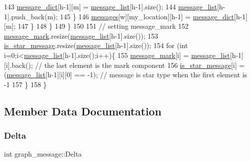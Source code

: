 \begin{DoxyCode}
143           \hyperlink{classgraph__message_ad0a6d35ac8550fb7ff03ce90fce7d5a5}{message\_dict}[h-1][m] = \hyperlink{classgraph__message_aa17fdb629b423343edfafa97252763ef}{message\_list}[h-1].size();
144           \hyperlink{classgraph__message_aa17fdb629b423343edfafa97252763ef}{message\_list}[h-1].push\_back(m);
145         \}
146         \hyperlink{classgraph__message_aac77e098f0acf9650116a8e51fe3b4b7}{messages}[w][my\_location][h-1] = \hyperlink{classgraph__message_ad0a6d35ac8550fb7ff03ce90fce7d5a5}{message\_dict}[h-1][m];
147       \}
148     \}
149   \}
150 
151   \textcolor{comment}{// setting message\_mark}
152   \hyperlink{classgraph__message_a49d9af5150daf0599c29fe18cb032fa5}{message\_mark}.resize(\hyperlink{classgraph__message_aa17fdb629b423343edfafa97252763ef}{message\_list}[h-1].size());
153   \hyperlink{classgraph__message_a55ff5531a0043106369e84a7bc45e22d}{is\_star\_message}.resize(\hyperlink{classgraph__message_aa17fdb629b423343edfafa97252763ef}{message\_list}[h-1].size());
154   \textcolor{keywordflow}{for} (\textcolor{keywordtype}{int} i=0;i<\hyperlink{classgraph__message_aa17fdb629b423343edfafa97252763ef}{message\_list}[h-1].size();i++)\{
155     \hyperlink{classgraph__message_a49d9af5150daf0599c29fe18cb032fa5}{message\_mark}[i] = \hyperlink{classgraph__message_aa17fdb629b423343edfafa97252763ef}{message\_list}[h-1][i].back(); \textcolor{comment}{// the last element is the mark
       component}
156     \hyperlink{classgraph__message_a55ff5531a0043106369e84a7bc45e22d}{is\_star\_message}[i] = (\hyperlink{classgraph__message_aa17fdb629b423343edfafa97252763ef}{message\_list}[h-1][i][0] == -1); \textcolor{comment}{// message is star
       type when the first element is -1}
157   \}
158 \}
\end{DoxyCode}


\subsection{Member Data Documentation}
\mbox{\label{classgraph__message_a45dfd061b7bc73572e5132fbf66efd55}} 
\subsubsection{\texorpdfstring{Delta}{Delta}}
{\footnotesize\ttfamily int graph\+\_\+message\+::\+Delta\hspace{0.3cm}{\ttfamily [private]}}



